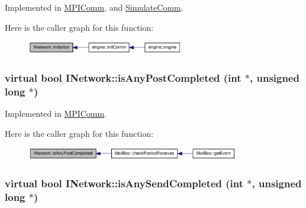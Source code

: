 Implemented in \hyperlink{class_m_p_i_comm_afd22e4e486b60da08f0b783c18ca0e2b}{MPIComm}, and \hyperlink{class_simulate_comm_a7086d3778f9c2d01d0425c4d940a57d1}{SimulateComm}.

Here is the caller graph for this function:\nopagebreak
\begin{figure}[H]
\begin{center}
\leavevmode
\includegraphics[width=194pt]{class_i_network_a5c706262a4275f321687a189686a2b81_icgraph}
\end{center}
\end{figure}
\hypertarget{class_i_network_a9e465b7489fd53410d3cb9ed532c4894}{
\subsubsection[{isAnyPostCompleted}]{\setlength{\rightskip}{0pt plus 5cm}virtual bool INetwork::isAnyPostCompleted (int $\ast$, \/  unsigned long $\ast$)}}
\label{class_i_network_a9e465b7489fd53410d3cb9ed532c4894}


Implemented in \hyperlink{class_m_p_i_comm_a897fbe8d99735dec4088197b9c4f2a23}{MPIComm}.

Here is the caller graph for this function:\nopagebreak
\begin{figure}[H]
\begin{center}
\leavevmode
\includegraphics[width=263pt]{class_i_network_a9e465b7489fd53410d3cb9ed532c4894_icgraph}
\end{center}
\end{figure}
\hypertarget{class_i_network_a4cf6eb047a7d028c3c4c023b59293061}{
\subsubsection[{isAnySendCompleted}]{\setlength{\rightskip}{0pt plus 5cm}virtual bool INetwork::isAnySendCompleted (int $\ast$, \/  unsigned long $\ast$)}}
\label{class_i_network_a4cf6eb047a7d028c3c4c023b59293061}


